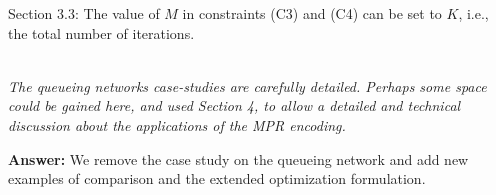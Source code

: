 \documentclass[suppldata]{interact}
\begin{document}
{Section 3.3: The value of $M$ in constraints (C3) and (C4) can be set to $K$, i.e., the total number of iterations. }

~\\


\textit{The queueing networks case-studies are carefully detailed. Perhaps
some space could be gained here, and used Section 4, to allow a
detailed and technical discussion about the applications of the MPR
encoding.}

\noindent
\textbf{Answer:} We remove the case study on the queueing network and add new examples of comparison and the extended optimization formulation. 


~\\






\end{document}
